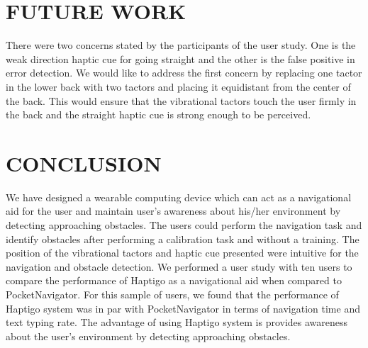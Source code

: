 \documentclass{sigchi}
\begin{document}

\section{FUTURE WORK}
There were two concerns stated by the participants of the user study. One is the weak direction haptic cue for going straight and the other is the false positive in error detection. We would like to address the first concern by replacing one tactor in the lower back with two tactors and placing it equidistant from the center of the back. This would ensure that the vibrational tactors touch the user firmly in the back and the straight haptic cue is strong enough to be perceived. 


\section{CONCLUSION}
We have designed a wearable computing device which can act as a navigational aid for the user and maintain user’s awareness about his/her environment by detecting approaching obstacles. The users could perform the navigation task and identify obstacles after performing a calibration task and without a training. The position of the vibrational tactors and haptic cue presented were intuitive for the navigation and obstacle detection. We performed a user study with ten users to compare the performance of Haptigo as a navigational aid when compared to PocketNavigator\cite{2010_Pielot_MobileHCI}. For this sample of users, we found that the performance of Haptigo system was in par with PocketNavigator\cite{2010_Pielot_MobileHCI} in terms of navigation time and text typing rate. The advantage of using Haptigo system is provides awareness about the user’s environment by detecting approaching obstacles.

%
%
%
%
%
\balance



\end{document}
